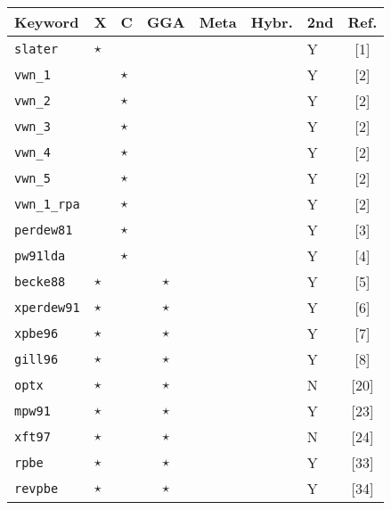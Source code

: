 \twocolumn
\begin{table}[htp]
\centering
{\scriptsize 
\begin{tabular}{|l|p{0.12cm}p{0.12cm}cccp{0.35cm}|c|}
\hline
Keyword    & X        & C           & GGA    & Meta & Hybr. & 2nd  & Ref.\\
\hline
{\tt  slater  }& $\star$  &             &        &      &        &  Y   &[1] \\
\hline                                                  
{\tt  vwn\_1   }&          &   $\star$   &        &      &        &  Y   &[2] \\
{\tt  vwn\_2   }&          &   $\star$   &        &      &        &  Y   &[2] \\
{\tt  vwn\_3   }&          &   $\star$   &        &      &        &  Y   &[2] \\
{\tt  vwn\_4   }&          &   $\star$   &        &      &        &  Y   &[2] \\
{\tt  vwn\_5   }&          &   $\star$   &        &      &        &  Y   &[2] \\
{\tt  vwn\_1\_rpa}&          &   $\star$   &        &      &        &  Y   &[2] \\
{\tt  perdew81 }&          &   $\star$   &        &      &        &  Y   &[3] \\
{\tt  pw91lda  }&          &   $\star$   &        &      &        &  Y   &[4] \\
\hline                                                  
{\tt  becke88  }& $\star$  &             &  $\star$  &   &        &  Y   &[5]\\
{\tt  xperdew91}& $\star$  &             &  $\star$  &   &        &  Y   &[6]\\
{\tt  xpbe96   }& $\star$  &             &  $\star$  &   &        &  Y   &[7]\\
{\tt  gill96   }& $\star$  &             &  $\star$  &   &        &  Y   &[8]\\
{\tt  optx     }& $\star$  &             &  $\star$  &   &        &  N   &[20]\\
{\tt  mpw91    }& $\star$  &             &  $\star$  &   &        &  Y   &[23]\\
{\tt  xft97    }& $\star$  &             &  $\star$  &   &        &  N   &[24]\\
{\tt  rpbe     }& $\star$  &             &  $\star$  &   &        &  Y   &[33]\\
{\tt  revpbe   }& $\star$  &             &  $\star$  &   &        &  Y   &[34]\\

\end{tabular}}
\end{table}
